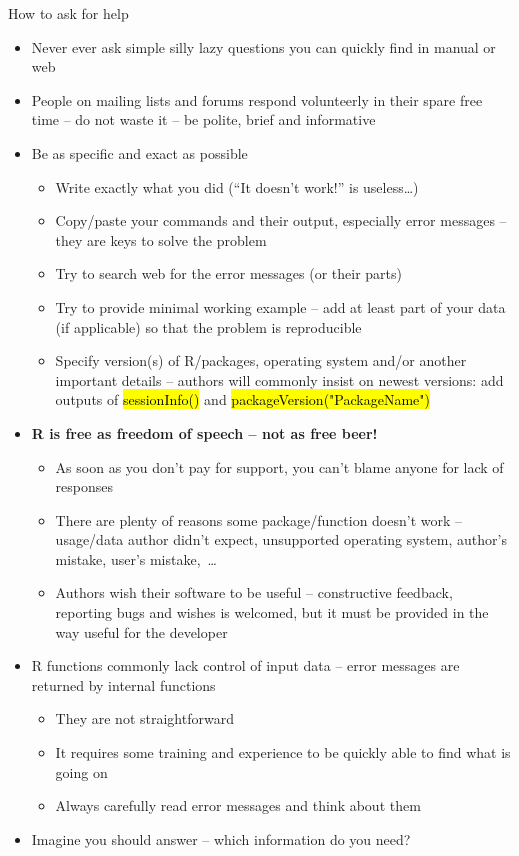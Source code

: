 \documentclass[compress, ucs, xelatex, 11pt, xcolor=svgnames,
  hyperref={
    bookmarks=true,
    unicode=true,
    colorlinks=true,
    pdftitle={Molecular data in R},
    plainpages=false,
    pdfauthor={Vojtech Zeisek},
    pdfsubject={Course about phylogeny and evolution in R},
    pdfcreator={XeLaTeX},
    pdfkeywords={R, evolution, phylogeny, molecular data},
    linkcolor=Tomato,
    anchorcolor=SaddleBrown,
    citecolor=Goldenrod,
    filecolor=DarkMagenta,
    menucolor=Sienna,
    urlcolor=DarkTurquoise,
    pdftex},
  url={hyphens, lowtilde} %
  ]{beamer}
\renewcommand{\texttt}[1]{\hl{\ttfamily #1}}
\begin{document}
\begin{frame}[allowframebreaks]{How to ask for help}
  \label{howtoask}
  \begin{itemize}
    \item \alert{Never ever} ask simple silly lazy questions you can quickly find in manual or web
    \item People on mailing lists and forums respond volunteerly in their spare free time -- do not waste it -- be polite, brief and informative
    \item Be as specific and exact as possible
    \begin{itemize}
      \item Write \alert{exactly} what you did (``It doesn't work!'' is useless\ldots)
      \item Copy/paste your commands and their output, especially error messages -- they are keys to solve the problem
      \item Try to search web for the error messages (or their parts)
      \item Try to provide minimal working example -- add at least part of your data (if applicable) so that the problem is reproducible
      \item Specify version(s) of R/packages, operating system and/or another important details -- authors will commonly insist on newest versions: add outputs of \texttt{sessionInfo()} and \texttt{packageVersion("PackageName")}
    \end{itemize}
    \item \textbf{R is free as freedom of speech -- not as free beer!}
    \begin{itemize}
      \item As soon as you don't pay for support, you can't blame anyone for lack of responses
      \item There are plenty of reasons some package/function doesn't work -- usage/data author didn't expect, unsupported operating system, author's mistake, user's mistake,~\ldots
      \item Authors wish their software to be useful -- constructive feedback, reporting bugs and wishes is welcomed, but it must be provided in the way useful for the developer
    \end{itemize}
    \item R functions commonly lack control of input data -- error messages are returned by internal functions
    \begin{itemize}
      \item They are not straightforward
      \item It requires some training and experience to be quickly able to find what is going on
      \item Always carefully read error messages and think about them
    \end{itemize}
    \item Imagine you should answer -- which information do you need?
  \end{itemize}
\end{frame}
\end{document}

